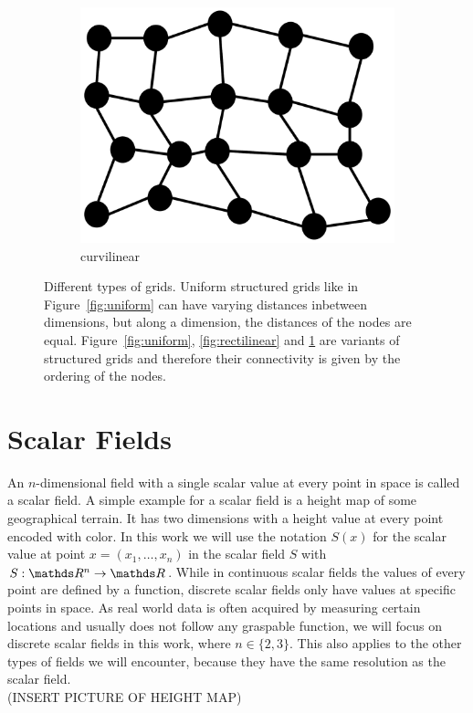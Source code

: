 \begin{figure}
\begin{subfigure}[b]{0.19\textwidth}
    \includegraphics[clip=true, width=\textwidth]{Images/Curvilinear.pdf}
    \caption{curvilinear}
    \label{fig:curvilinear}
  \end{subfigure}
  
  \caption{Different types of grids. Uniform structured grids like in
  Figure~\ref{fig:uniform} can have varying distances inbetween
  dimensions, but along a dimension, the distances of the nodes are
  equal. Figure~\ref{fig:uniform}, \ref{fig:rectilinear} and
  \ref{fig:curvilinear} are variants of structured grids and therefore
  their connectivity is given by the ordering of the nodes.}
  \label{fig:grids}
\end{figure}

\section{Scalar Fields}

An $n$-dimensional field with a single scalar value at every point in
space is called a scalar field. A simple example for a scalar field is a
height map of some geographical terrain. It has two dimensions with a
height value at every point encoded with color. In this work we will use
the notation $S(x)$ for the scalar value at point $x = (x_1,\dots,x_n)$
in the scalar field $S$ with $S: \real^n \rightarrow \real$. While in
continuous scalar fields the values of every point are defined by a
function, discrete scalar fields only have values at specific points in
space. As real world data is often acquired by measuring certain
locations and usually does not follow any graspable function, we will
focus on discrete scalar fields in this work, where $n \in \{2,3\}$.
This also applies to the other types of fields we will encounter,
because they have the same resolution as the scalar field.
\\(INSERT PICTURE OF HEIGHT MAP)

